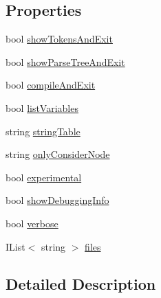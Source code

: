 \subsection*{Properties}
\begin{DoxyCompactItemize}
\item 
bool \hyperlink{a00182_ab1a387df201e3e136c15e5744219628d}{show\-Tokens\-And\-Exit}
\item 
bool \hyperlink{a00182_abef6bf44ae4792d7644b1c02de625208}{show\-Parse\-Tree\-And\-Exit}
\item 
bool \hyperlink{a00182_af9b6917244075618720f2a90bbe6ef56}{compile\-And\-Exit}
\item 
bool \hyperlink{a00182_a062775744f2d7144527fa3bca4b9b3ce}{list\-Variables}
\item 
string \hyperlink{a00093_a7e43c3b73722956cb0f5d507e4eef527}{string\-Table}
\item 
string \hyperlink{a00093_af4c0062a1d46281d377f87084fde374e}{only\-Consider\-Node}
\item 
bool \hyperlink{a00093_ad97950e47ce2aaeb598295b7c3c44b13}{experimental}
\item 
bool \hyperlink{a00031_a89964ea17bd19caf00cb5bff563ed01c}{show\-Debugging\-Info}
\item 
bool \hyperlink{a00031_ada4d83d1756918f362d55f6649b82b17}{verbose}
\item 
I\-List$<$ string $>$ \hyperlink{a00031_aa93cbb1bc1d5328e0a417012621e92d2}{files}
\end{DoxyCompactItemize}


\subsection{Detailed Description}


